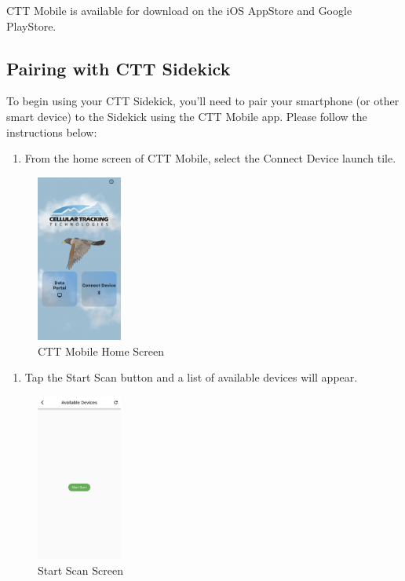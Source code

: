 \documentclass[
]{article}
\providecommand{\tightlist}{%
  \setlength{\itemsep}{0pt}\setlength{\parskip}{0pt}}
\begin{document}
CTT Mobile is available for download on the iOS AppStore and Google
PlayStore.

\hypertarget{pairing-with-ctt-sidekick}{%
\subsection{Pairing with CTT Sidekick}\label{pairing-with-ctt-sidekick}}

To begin using your CTT Sidekick, you'll need to pair your smartphone
(or other smart device) to the Sidekick using the CTT Mobile app. Please
follow the instructions below:

\begin{enumerate}
\def\labelenumi{\arabic{enumi}.}
\tightlist
\item
  From the home screen of CTT Mobile, select the Connect Device launch
  tile.
\end{enumerate}

\begin{figure}
\hypertarget{id}{%
\centering
\includegraphics[width=0.25\textwidth,height=\textheight]{./images/CTT Mobile_1.jpg}
\caption{CTT Mobile Home Screen}\label{id}
}
\end{figure}

\begin{enumerate}
\def\labelenumi{\arabic{enumi}.}
\setcounter{enumi}{1}
\tightlist
\item
  Tap the Start Scan button and a list of available devices will appear.
\end{enumerate}

\begin{figure}
\hypertarget{id}{%
\centering
\includegraphics[width=0.25\textwidth,height=\textheight]{./images/CTT Mobile_2.jpg}
\caption{Start Scan Screen}\label{id}
}
\end{figure}
\end{document}
